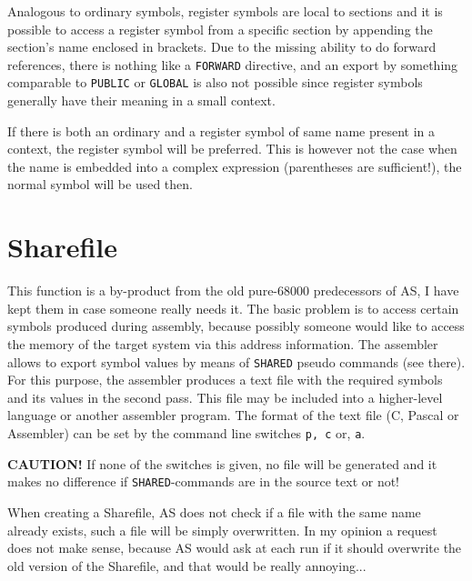 \documentclass[12pt,twoside]{report}
\makeatletter
\newcommand{\bb}[1]{{\bf #1}}
\newcommand{\tty}[1]{{\tt #1}}
\newcommand{\ttindex}[1]{\index{#1@{\tt #1}}}
\makeatother
\begin{document}
Analogous to ordinary symbols, register symbols are local to sections and
it is possible to access a register symbol from a specific section by
appending the section's name enclosed in brackets.  Due to the missing
ability to do forward references, there is nothing like a \tty{FORWARD}
directive, and an export by something comparable to \tty{PUBLIC} or
\tty{GLOBAL} is also not possible since register symbols generally have
their meaning in a small context.

If there is both an ordinary and a register symbol of same name present in
a context, the register symbol will be preferred.  This is however not the
case when the name is embedded into a complex expression (parentheses are
sufficient!), the normal symbol will be used then.


\section{Sharefile}
\label{ChapShareMain}
\ttindex{SHARED}

This function is a by-product from the old pure-68000 predecessors of
AS, I have kept them in case someone really needs it.  The basic
problem is to access certain symbols produced during assembly,
because possibly someone would like to access the memory of the
target system via this address information.  The assembler allows to
export symbol values by means of \tty{SHARED} pseudo commands (see there). 
For this purpose, the assembler produces a text file with the required
symbols and its values in the second pass.  This file may be included
into a higher-level language or another assembler program.  The
format of the text file (C, Pascal or Assembler) can be set by the
command line switches \tty{p, c} or, \tty{a}.

\bb{CAUTION!} If none of the switches is given, no file will be 
generated and it makes no difference if \tty{SHARED}-commands are in the 
source text or not!

When creating a Sharefile, AS does not check if a file with the 
same name already exists, such a file  will be simply overwritten.  
In my opinion a request does not make sense, because AS would 
ask at each run if it should overwrite the old version of the 
Sharefile, and that would be really annoying...

\end{document}
